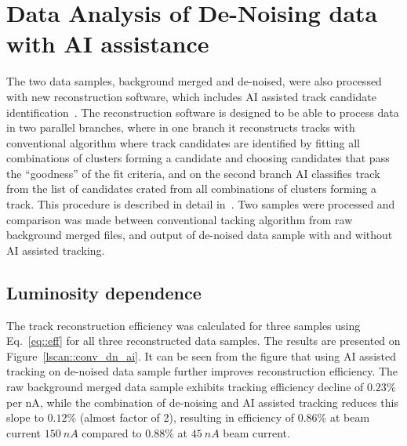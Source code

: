 \section{Data Analysis of De-Noising data with AI assistance}

The two data samples, background merged and de-noised, were also processed with new 
reconstruction software, which includes AI assisted track candidate identification~\cite{Gavalian:2022mlp}. The reconstruction software is designed to be able to process data in two parallel branches, where in one branch it reconstructs tracks with conventional algorithm where track candidates are identified by fitting all combinations of clusters forming a candidate and choosing candidates that pass the ``goodness'' of the fit criteria,  and on the second branch AI classifies track from the list of candidates crated from all combinations of clusters forming a track. This procedure is described in detail in~\cite{Gavalian:2022mlp}. Two samples were processed and comparison was made 
between conventional tacking algorithm from raw background merged files, and output of de-noised data sample with and without AI assisted tracking. 

\subsection{Luminosity dependence}

The track reconstruction efficiency was calculated for three samples using Eq.~\ref{eq::eff} for all three reconstructed data samples. The results are presented on Figure~\ref{lscan::conv_dn_ai}. It can be seen from the figure that using AI assisted tracking on de-noised data sample further improves reconstruction efficiency. The raw background merged data sample exhibits tracking efficiency decline of $0.23\%$ per nA, while the combination of de-noising and AI assisted tracking reduces this slope to $0.12\%$ (almost factor of 2), resulting in efficiency of $0.86\%$ at beam current $150~nA$ compared to $0.88\%$ at $45~nA$ beam current. 

